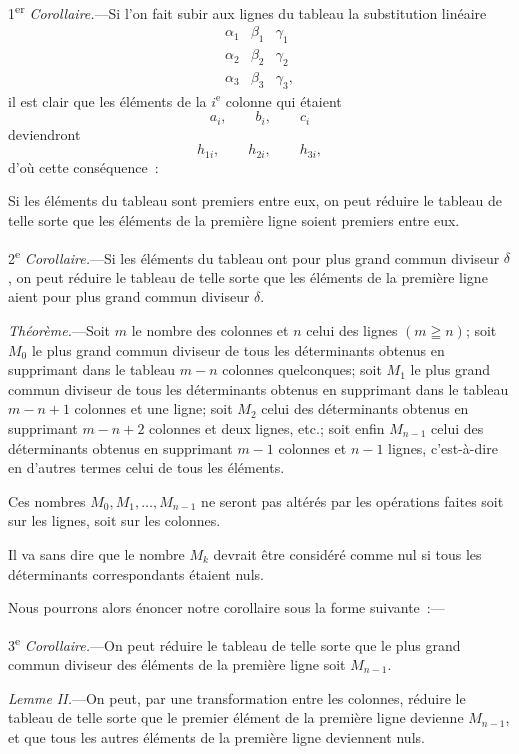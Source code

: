 \documentclass{article}
\begin{document}
1\textsuperscript{er} \emph{Corollaire.}---Si l'on fait subir aux lignes du tableau la substitution linéaire
\[ \begin{matrix} \alpha_{1} & \beta_{1} & \gamma_{1} \\[1ex] \alpha_{2} & \beta_{2} & \gamma_{2} \\[1ex] \alpha_{3} & \beta_{3} & \gamma_{3}, \end{matrix} \]
il est clair que les éléments de la $i^{\text{e}}$ colonne qui étaient
\[ a_{i}, \qquad b_{i}, \qquad c_{i} \]
deviendront
\[ h_{1i}, \qquad h_{2i}, \qquad h_{3i}, \]
d'où cette conséquence~:

Si les éléments du tableau sont premiers entre eux, on peut réduire le tableau de telle sorte que les éléments de la première ligne soient premiers entre eux.

2\textsuperscript{e} \emph{Corollaire.}---Si les éléments du tableau ont pour plus grand commun diviseur $\delta$, on peut réduire le tableau de telle sorte que les éléments de la première ligne aient pour plus grand commun diviseur $\delta$.

\emph{Théorème.}---Soit $m$ le nombre des colonnes et $n$ celui des lignes $(m \geqq n)$; soit $M_{0}$ le plus grand commun diviseur de tous les déterminants obtenus en supprimant dans le tableau $m-n$ colonnes quelconques; soit $M_{1}$ le plus grand commun diviseur de tous les déterminants obtenus en supprimant dans le tableau $m-n+1$ colonnes et une ligne; soit $M_{2}$ celui des déterminants obtenus en supprimant $m-n+2$ colonnes et deux lignes, etc.; soit enfin $M_{n-1}$ celui des déterminants obtenus en supprimant $m-1$ colonnes et $n-1$ lignes, c'est-à-dire en d'autres termes celui de tous les éléments.

Ces nombres $M_{0}, M_{1}, \ldots, M_{n-1}$ ne seront pas altérés par les opérations faites soit sur les lignes, soit sur les colonnes.

Il va sans dire que le nombre $M_{k}$ devrait être considéré comme nul si tous les déterminants correspondants étaient nuls.

Nous pourrons alors énoncer notre corollaire sous la forme suivante~:---

3\textsuperscript{e} \emph{Corollaire.}---On peut réduire le tableau de telle sorte que le plus grand commun diviseur des éléments de la première ligne soit $M_{n-1}$.

\emph{Lemme II.}---On peut, par une transformation entre les colonnes, réduire le tableau de telle sorte que le premier élément de la première
ligne devienne $M_{n-1}$, et que tous les autres éléments de la première ligne deviennent nuls.
\end{document}
